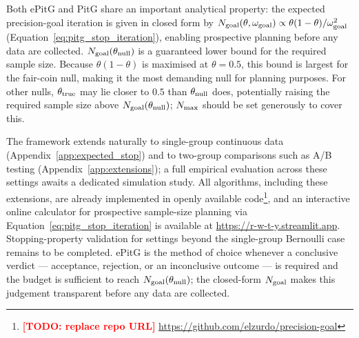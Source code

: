 Both ePitG and PitG share an important analytical property: the expected precision-goal
iteration is given in closed form by
$N_{\rm goal}(\theta,\omega_{\rm goal}) \propto \theta(1-\theta)/\omega_{\rm goal}^2$
(Equation~\ref{eq:pitg_stop_iteration}), enabling prospective planning before any data
are collected. $N_{\rm goal}(\theta_{\rm null})$ is a guaranteed lower bound
for the required sample size. Because $\theta(1-\theta)$ is maximised at $\theta=0.5$,
this bound is largest for the fair-coin null, making it the most demanding null for
planning purposes. For other nulls, $\theta_{\rm true}$ may lie closer to $0.5$ than
$\theta_{\rm null}$ does, potentially raising the required sample size above
$N_{\rm goal}(\theta_{\rm null})$;
$N_{\rm max}$ should be set generously to cover this.

The framework extends naturally to single-group continuous data
(Appendix~\ref{app:expected_stop}) and to two-group comparisons such as A/B testing
(Appendix~\ref{app:extensions}); a full empirical evaluation across
these settings awaits a dedicated simulation study.
All algorithms, including these extensions, are already implemented in openly available
code\footnote{\textcolor{red}{\textbf{[TODO: replace repo URL]}}
\href{https://github.com/elzurdo/precision-goal}{https://github.com/elzurdo/precision-goal}},
and an interactive online calculator for prospective sample-size planning via
Equation~\ref{eq:pitg_stop_iteration} is available at
\href{https://r-w-t-y.streamlit.app}{https://r-w-t-y.streamlit.app}.
Stopping-property validation for settings beyond the single-group Bernoulli case
remains to be completed.
ePitG is the method of choice whenever a conclusive verdict --- acceptance, rejection,
or an inconclusive outcome --- is required and the budget is sufficient to reach
$N_{\rm goal}(\theta_{\rm null})$; the closed-form $N_{\rm goal}$ makes this judgement
transparent before any data are collected.

